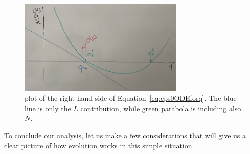 \begin{figure}
    \centering
    \includegraphics[width=0.7\textwidth]{figures/epsilon0-stable-points.png}
    \caption{
      plot of the right-hand-side of Equation~\eqref{eq:eps0ODEforq}.
      The blue line is only the \(L\) contribution, while green parabola is including also \(N\).
    }
    \label{fig:epsilon0stablepoints}
\end{figure}
To conclude our analysis, let us make a few considerations that will give us a clear picture
of how evolution works in this simple situation.
